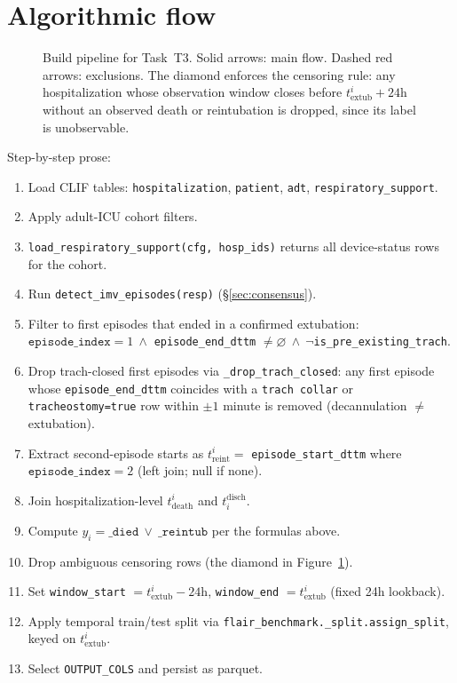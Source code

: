 \documentclass[11pt]{article}
\newcommand{\textub}{t_{\text{extub}}}
\newcommand{\tdeath}{t_{\text{death}}}
\newcommand{\treint}{t_{\text{reint}}}
\begin{document}
\section{Algorithmic flow}
\label{sec:flow}

\begin{figure}[H]
\centering

\caption{Build pipeline for Task~T3. Solid arrows: main flow. Dashed
red arrows: exclusions. The diamond enforces the censoring rule: any
hospitalization whose observation window closes before
$\textub^i + 24\text{h}$ without an observed death or reintubation is
dropped, since its label is unobservable.}
\label{fig:t3-flow}
\end{figure}

Step-by-step prose:

\begin{enumerate}[leftmargin=2em]
  \item Load CLIF tables: \texttt{hospitalization}, \texttt{patient},
        \texttt{adt}, \texttt{respiratory\_support}.
  \item Apply adult-ICU cohort filters.
  \item \texttt{load\_respiratory\_support(cfg, hosp\_ids)} returns all
        device-status rows for the cohort.
  \item Run \texttt{detect\_imv\_episodes(resp)} (\S\ref{sec:consensus}).
  \item Filter to first episodes that ended in a confirmed extubation:
        $\texttt{episode\_index} = 1\ \wedge$ \texttt{episode\_end\_dttm}
        $\neq \varnothing\ \wedge\ \neg$\texttt{is\_pre\_existing\_trach}.
  \item Drop trach-closed first episodes via
        \texttt{\_drop\_trach\_closed}: any first episode whose
        \texttt{episode\_end\_dttm} coincides with a
        \texttt{trach collar} or \texttt{tracheostomy=true} row within
        $\pm 1$ minute is removed (decannulation $\neq$ extubation).
  \item Extract second-episode starts as
        $\treint^i = $ \texttt{episode\_start\_dttm} where
        $\texttt{episode\_index} = 2$ (left join; null if none).
  \item Join hospitalization-level $\tdeath^i$ and $t^{\text{disch}}_i$.
  \item Compute $y_i = \texttt{\_died}\ \vee\ \texttt{\_reintub}$ per
        the formulas above.
  \item Drop ambiguous censoring rows (the diamond in
        Figure~\ref{fig:t3-flow}).
  \item Set \texttt{window\_start} $= \textub^i - 24$h,
        \texttt{window\_end} $= \textub^i$ (fixed 24h lookback).
  \item Apply temporal train/test split via
        \texttt{flair\_benchmark.\_split.assign\_split}, keyed on
        $\textub^i$.
  \item Select \texttt{OUTPUT\_COLS} and persist as parquet.
\end{enumerate}
\end{document}

